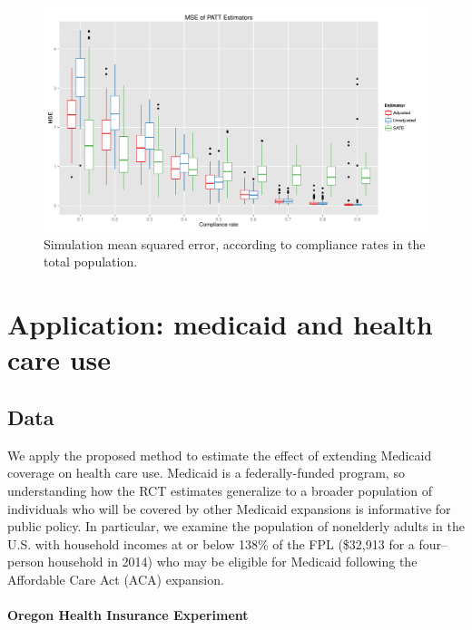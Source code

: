 \documentclass[12pt]{article}
\begin{document}
\begin{figure}[h]
\begin{center}
\includegraphics[width = 1\textwidth]{mse_boxplots_B5}
\caption{Simulation mean squared error, according to compliance rates in the total population.}
\label{fig:sim_compliance}
\end{center}
\end{figure}





\section{Application: medicaid and health care use}
\subsection{Data} \label{data}

We apply the proposed method to estimate the effect of extending Medicaid coverage on health care use.  Medicaid is a federally-funded program, so understanding how the RCT estimates generalize to a broader population of individuals who will be covered by other Medicaid expansions is informative for public policy. In particular, we examine the population of nonelderly adults in the U.S. with household incomes at or below 138\% of the FPL (\$32,913 for a four--person household in 2014) who may be eligible for Medicaid following the Affordable Care Act (ACA) expansion.

\paragraph{Oregon Health Insurance Experiment}
\end{document}
